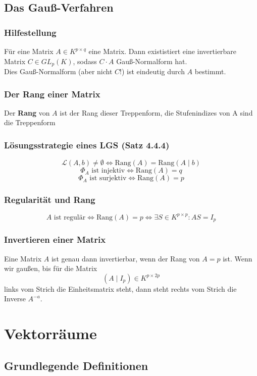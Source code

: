 \documentclass{kit}
\begin{document}
  \subsection{Das Gauß-Verfahren}
    \subsubsection{Hilfestellung}
      Für eine Matrix $A\in K^{p\times q}$ eine Matrix. Dann exististiert eine invertierbare Matrix $C\in GL_p(K)$, sodass $C\cdot A$ Gauß-Normalform hat.\\
      Dies Gauß-Normalform (aber nicht $C$!) ist eindeutig durch $A$ bestimmt.
    \subsubsection{Der Rang einer Matrix}
      Der \textbf{Rang} von $A$ ist der Rang dieser Treppenform, die Stufenindizes von A sind die Treppenform
    \subsubsection{Lösungsstrategie eines LGS (Satz 4.4.4)}
      $$\mathcal{L}(A,b)\neq\emptyset\Longleftrightarrow\text{Rang}(A)=\text{Rang}(A\mid b)$$
      $$\Phi_A\text{ ist injektiv}\Longleftrightarrow\text{Rang}(A)=q$$
      $$\Phi_A\text{ ist surjektiv}\Longleftrightarrow\text{Rang}(A)=p$$
    \subsubsection{Regularität und Rang}
      $$A\text{ ist regulär}\Longleftrightarrow\text{Rang}(A)=p \Longleftrightarrow\exists S\in K^{p\times p}:AS=I_p$$
    \subsubsection{Invertieren einer Matrix}
      Eine Matrix $A$ ist genau dann invertierbar, wenn der Rang von $A=p$ ist. Wenn wir gaußen, bis für die Matrix
      $$(A\mid I_p)\in K^{p\times 2p}$$
      links vom Strich die Einheitsmatrix steht, dann steht rechts vom Strich die Inverse $A^{-a}$.
\section{Vektorräume}
  \subsection{Grundlegende Definitionen}
\end{document}
